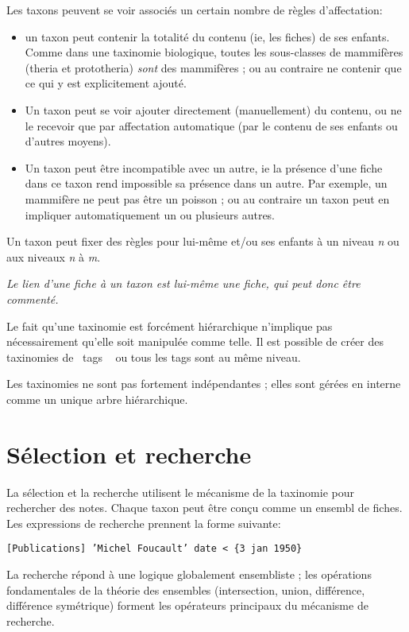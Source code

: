 \documentclass[11pt,french]{article}
\makeatletter
\providecommand{\og}{\leavevmode\flqq~}%
\providecommand{\fg}{\ifdim\lastskip>\z@\unskip\fi~\frqq}%
\makeatother
\begin{document}
Les taxons peuvent se voir associés un certain nombre de règles d'affectation:
\begin{itemize}
\item un taxon peut contenir la totalité du contenu (ie, les fiches) de
ses enfants. Comme dans une taxinomie biologique, toutes les sous-classes
de mammifères (theria et prototheria) \emph{sont} des mammifères ;
ou au contraire ne contenir que ce qui y est explicitement ajouté.
\item Un taxon peut se voir ajouter directement (manuellement) du contenu,
ou ne le recevoir que par affectation automatique (par le contenu
de ses enfants ou d'autres moyens). 
\item Un taxon peut être incompatible avec un autre, ie la présence d'une
fiche dans ce taxon rend impossible sa présence dans un autre. Par
exemple, un mammifère ne peut pas être un poisson ; ou au contraire
un taxon peut en impliquer automatiquement un ou plusieurs autres. 
\end{itemize}
Un taxon peut fixer des règles pour lui-même et/ou ses enfants à un
niveau \emph{n} ou aux niveaux \emph{n }à \emph{m}.

\emph{Le lien d'une fiche à un taxon est lui-même une fiche, qui peut
donc être commenté. }

Le fait qu'une taxinomie est forcément hiérarchique n'implique pas
nécessairement qu'elle soit manipulée comme telle. Il est possible
de créer des taxinomies de \og tags \fg{} ou tous les tags sont
au même niveau.

Les taxinomies ne sont pas fortement indépendantes ; elles sont gérées
en interne comme un unique arbre hiérarchique. 


\section{Sélection et recherche}

La sélection et la recherche utilisent le mécanisme de la taxinomie
pour rechercher des notes. Chaque taxon peut être conçu comme un ensembl
de fiches. Les expressions de recherche prennent la forme suivante:

\texttt{{[}Publications{]} 'Michel Foucault' date < \{3 jan 1950\}}

La recherche répond à une logique globalement ensembliste ; les opérations
fondamentales de la théorie des ensembles (intersection, union, différence,
différence symétrique) forment les opérateurs principaux du mécanisme
de recherche. 
\end{document}
